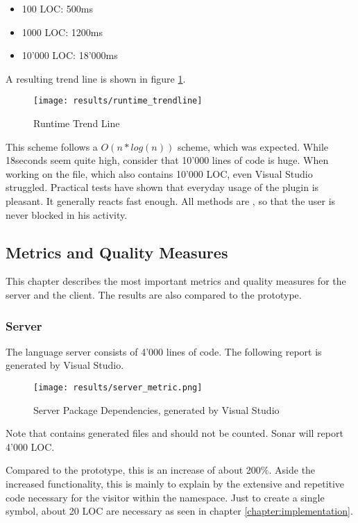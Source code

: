 \begin{itemize}
    \item 100 LOC: 500ms
    \item 1000 LOC: 1200ms
    \item 10'000 LOC: 18'000ms
\end{itemize}

A resulting trend line is shown in figure \ref{fig:trendline_1}.

\begin{figure}[H]
    \centering
    \texttt{[image: results/runtime\_trendline]}
    \caption{Runtime Trend Line}
    \label{fig:trendline_1}
\end{figure}

This scheme follows a $O(n*log(n))$ scheme, which was expected.
While 18seconds seem quite high, consider that 10'000 lines of code is huge.
When working on the  file, which also contains 10'000 LOC, even Visual Studio struggled.
Practical tests have shown that everyday usage of the plugin is pleasant.
It generally reacts fast enough.
All methods are , so that the user is never blocked in his activity.

\subsection{Metrics and Quality Measures}
\label{section:results:metrics}
This chapter describes the most important metrics and quality measures for the server and the client.
The results are also compared to the prototype.

\subsubsection{Server}
The language server consists of 4'000 lines of code. The following report is generated by Visual Studio.
\begin{figure}[H]
    \centering
    \texttt{[image: results/server\_metric.png]}
    \caption{Server Package Dependencies, generated by Visual Studio}
    \label{fig:dependency_graph}
\end{figure}
Note that  contains generated files and should not be counted.
Sonar will report 4'000 LOC.

Compared to the prototype, this is an increase of about 200\%.
Aside the increased functionality, this is mainly to explain by the extensive and repetitive code necessary for the visitor within the  namespace.
Just to create a single symbol, about 20 LOC are necessary as seen in chapter \ref{chapter:implementation}.\\

